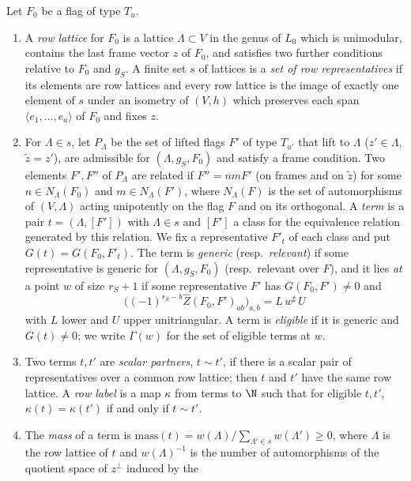 \begin{definition}\label{pf:thmS-leaves:def:terms}
Let $F_0$ be a flag of type $T_u$.
\begin{enumerate}
\item A \emph{row lattice} for $F_0$ is a lattice $\Lambda\subset V$ in the genus of $L_0$ which is unimodular, contains
the last frame vector $z$ of $F_0$, and satisfies two further conditions relative to $F_0$ and $g_S$. A finite set $s$ of
lattices is a \emph{set of row representatives} if its elements are row lattices and every row lattice is the image of
exactly one element of $s$ under an isometry of $(V,h)$ which preserves each span $\langle e_1,\dots,e_a\rangle$ of $F_0$
and fixes $z$.
\item For $\Lambda\in s$, let $P_\Lambda$ be the set of lifted flags $F'$ of type $T_{u'}$ that lift to $\Lambda$
($z'\in\Lambda$, $\tilde z=z'$), are admissible for $(\Lambda,g_S,F_0)$ and satisfy a frame condition. Two elements
$F',F''$ of $P_\Lambda$ are related if $F''=nmF'$ (on frames and on $\tilde z$) for some $n\in N_\Lambda(F_0)$ and
$m\in N_\Lambda(F')$, where $N_\Lambda(F)$ is the set of automorphisms of $(V,\Lambda)$ acting unipotently on the flag $F$
and on its orthogonal. A \emph{term} is a pair $t=(\Lambda,[F'])$ with $\Lambda\in s$ and $[F']$ a class for the
equivalence relation generated by this relation. We fix a representative $F'_t$ of each class and put
$G(t)=G(F_0,F'_t)$. The term is \emph{generic} (resp.\ \emph{relevant}) if some representative is generic for
$(\Lambda,g_S,F_0)$ (resp.\ relevant over $F$), and it lies \emph{at} a point $w$ of size $r_S+1$ if some representative
$F'$ has $G(F_0,F')\ne0$ and
\[
\bigl((-1)^{r_S-b}\widehat Z(F_0,F')_{ab}\bigr)_{a,b}=L\,w^\sharp\,U
\]
with $L$ lower and $U$ upper unitriangular. A term is \emph{eligible} if it is generic and $G(t)\ne0$; we write
$\Gamma(w)$ for the set of eligible terms at $w$.
\item Two terms $t,t'$ are \emph{scalar partners}, $t\sim t'$, if there is a scalar pair of representatives over a
common row lattice; then $t$ and $t'$ have the same row lattice. A \emph{row label} is a map $\kappa$ from terms to $\N$
such that for eligible $t,t'$, $\kappa(t)=\kappa(t')$ if and only if $t\sim t'$.
\item The \emph{mass} of a term is $\mathrm{mass}(t)=w(\Lambda)/\sum_{\Lambda'\in s}w(\Lambda')\ge0$, where $\Lambda$ is the
row lattice of $t$ and $w(\Lambda)^{-1}$ is the number of automorphisms of the quotient space of $z^\perp$ induced by the

\end{enumerate}
\end{definition}
